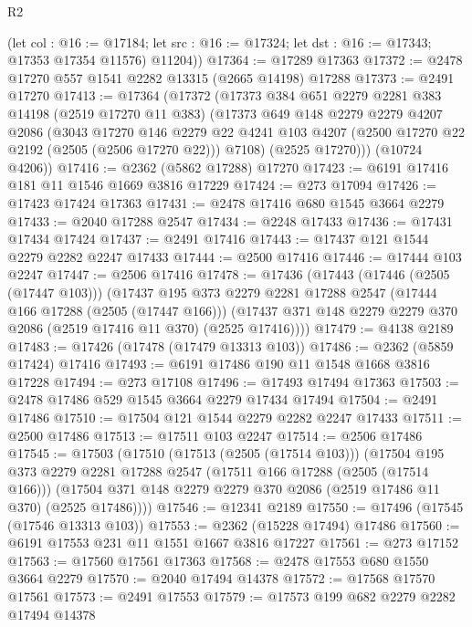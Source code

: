 \begin{lexlean}{R2}
\begin{coremodule}
        (let col : @16 := @17184;
        let src : @16 := @17324; let dst : @16 := @17343; @17353 @17354 @11576)
        @11204))
@17364 := @17289 @17363
@17372 := @2478 @17270 @557 @1541 @2282 @13315 (@2665 @14198) @17288
@17373 := @2491 @17270
@17413 := @17364
    (@17372
      (@17373
        @384
        @651
        @2279
        @2281
        @383
        @14198
        (@2519 @17270 @11 @383)
        (@17373
          @649
          @148
          @2279
          @2279
          @4207
          @2086
          (@3043
            @17270
            @146
            @2279
            @22
            @4241
            @103
            @4207
            (@2500 @17270 @22 @2192 (@2505 (@2506 @17270 @22)))
            @7108)
          (@2525 @17270)))
      (@10724 @4206))
@17416 := @2362 (@5862 @17288) @17270
@17423 := @6191 @17416 @181 @11 @1546 @1669 @3816 @17229
@17424 := @273 @17094
@17426 := @17423 @17424 @17363
@17431 := @2478 @17416 @680 @1545 @3664 @2279
@17433 := @2040 @17288 @2547
@17434 := @2248 @17433
@17436 := @17431 @17434 @17424
@17437 := @2491 @17416
@17443 := @17437 @121 @1544 @2279 @2282 @2247 @17433
@17444 := @2500 @17416
@17446 := @17444 @103 @2247
@17447 := @2506 @17416
@17478 := @17436
    (@17443
      (@17446 (@2505 (@17447 @103)))
      (@17437
        @195
        @373
        @2279
        @2281
        @17288
        @2547
        (@17444 @166 @17288 (@2505 (@17447 @166)))
        (@17437 @371 @148 @2279 @2279 @370 @2086 (@2519 @17416 @11 @370) (@2525 @17416))))
@17479 := @4138 @2189
@17483 := @17426 (@17478 (@17479 @13313 @103))
@17486 := @2362 (@5859 @17424) @17416
@17493 := @6191 @17486 @190 @11 @1548 @1668 @3816 @17228
@17494 := @273 @17108
@17496 := @17493 @17494 @17363
@17503 := @2478 @17486 @529 @1545 @3664 @2279 @17434 @17494
@17504 := @2491 @17486
@17510 := @17504 @121 @1544 @2279 @2282 @2247 @17433
@17511 := @2500 @17486
@17513 := @17511 @103 @2247
@17514 := @2506 @17486
@17545 := @17503
    (@17510
      (@17513 (@2505 (@17514 @103)))
      (@17504
        @195
        @373
        @2279
        @2281
        @17288
        @2547
        (@17511 @166 @17288 (@2505 (@17514 @166)))
        (@17504 @371 @148 @2279 @2279 @370 @2086 (@2519 @17486 @11 @370) (@2525 @17486))))
@17546 := @12341 @2189
@17550 := @17496 (@17545 (@17546 @13313 @103))
@17553 := @2362 (@15228 @17494) @17486
@17560 := @6191 @17553 @231 @11 @1551 @1667 @3816 @17227
@17561 := @273 @17152
@17563 := @17560 @17561 @17363
@17568 := @2478 @17553 @680 @1550 @3664 @2279
@17570 := @2040 @17494 @14378
@17572 := @17568 @17570 @17561
@17573 := @2491 @17553
@17579 := @17573 @199 @682 @2279 @2282 @17494 @14378

\end{coremodule}
\end{lexlean}
